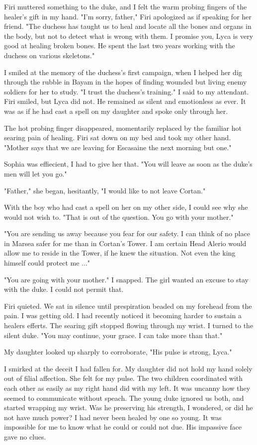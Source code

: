 \documentclass{article}
\begin{document}
Firi muttered something to the duke, and I felt the warm probing fingers of the healer's gift in my hand. "I'm sorry, father," Firi apologized as if speaking for her friend. "The duchess has taught us to heal and locate all the bones and organs in the body, but not to detect what is wrong with them. I promise you, Lyca is very good at healing broken bones. He spent the last two years working with the duchess on various skeletons." 

I smiled at the memory of the duchess's first campaign, when I helped her dig through the rubble in Bayam in the hopes of finding wounded but living enemy soldiers for her to study. "I trust the duchess's training." I said to my attendant. Firi smiled, but Lyca did not. He remained as silent and emotionless as ever. It was as if he had cast a spell on my daughter and spoke only through her.

The hot probing finger disappeared, momentarily replaced by the familiar hot searing pain of healing. Firi sat down on my bed and took my other hand. "Mother says that we are leaving for Escasaine the next morning but one."

Sophia was effiecient, I had to give her that. "You will leave as soon as the duke's men will let you go."

"Father," she began, hesitantly, "I would like to not leave Cortan."

With the boy who had cast a spell on her on my other side, I could see why she would not wish to. "That is out of the question. You go with your mother."

"You are sending us away because you fear for our safety. I can think of no place in Marsea safer for me than in Cortan's Tower. I am certain Head Alerio would allow me to reside in the Tower, if he knew the situation. Not even the king himself could protect me ..."

"You are going with your mother." I snapped. The girl wanted an excuse to stay with the duke. I could not permit that.

Firi quieted. We sat in silence until prespiration beaded on my forehead from the pain. I was getting old. I had recently noticed it becoming harder to sustain a healers efferts. The searing gift stopped flowing through my wrist. I turned to the silent duke. "You may continue, your grace. I can take more than that."

My daughter looked up sharply to corroborate, "His pulse is strong, Lyca." 

I smirked at the deceit I had fallen for. My daughter did not hold my hand solely out of filial affection. She felt for my pulse. The two children coordinated with each other as easily as my right hand did with my left. It was uncanny how they seemed to communicate without speach. The young duke ignored us both, and started wrapping my wrist. Was he preserving his strength, I wondered, or did he not have much power? I had never been healed by one so young. It was impossible for me to know what he could or could not due. His impassive face gave no clues.
\end{document}
